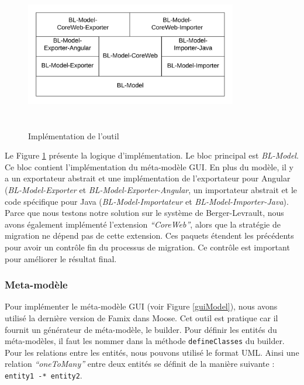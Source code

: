 \documentclass[11pt,]{article}
\begin{document}
\hypertarget{codeImpl}{%
\begin{figure}
\centering
\includegraphics[width=3.64583in,height=2.60417in]{figures/codeImpl.png}
\caption{Implémentation de l'outil}\label{codeImpl}
\end{figure}
}

Le Figure \ref{codeImpl} présente la logique d'implémentation. Le bloc
principal est \emph{BL-Model}. Ce bloc contient l'implémentation du
méta-modèle GUI. En plus du modèle, il y a un exportateur abstrait et
une implémentation de l'exportateur pour Angular
(\emph{BL-Model-Exporter} et \emph{BL-Model-Exporter-Angular}, un
importateur abstrait et le code spécifique pour Java
(\emph{BL-Model-Importateur} et \emph{BL-Model-Importer-Java}). Parce
que nous testons notre solution sur le système de Berger-Levrault, nous
avons également implémenté l'extension \emph{``CoreWeb''}, alors que la
stratégie de migration ne dépend pas de cette extension. Ces paquets
étendent les précédents pour avoir un contrôle fin du processus de
migration. Ce contrôle est important pour améliorer le résultat final.

\hypertarget{meta-moduxe8le}{%
\subsubsection{Meta-modèle}\label{meta-moduxe8le}}

Pour implémenter le méta-modèle GUI (voir Figure \ref{guiModel}), nous
avons utilisé la dernière version de Famix dans Moose. Cet outil est
pratique car il fournit un générateur de méta-modèle, le builder. Pour
définir les entités du méta-modèles, il faut les nommer dans la méthode
\texttt{defineClasses} du builder. Pour les relations entre les entités,
nous pouvons utilisé le format UML. Ainsi une relation
\emph{``oneToMany''} entre deux entités se définit de la manière
suivante : \texttt{entity1\ -*\ entity2}.
\end{document}
